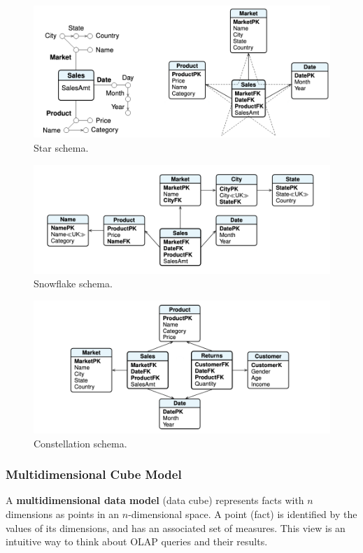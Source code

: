 \begin{figure}[ht]
    \centering
    \includegraphics[width=0.65\linewidth]{img/star_schema.png}
    \caption{Star schema.}
    \label{fig:star-schema}
\end{figure} 
\begin{figure}[ht]
    \centering
    \includegraphics[width=0.65\linewidth]{img/snowflake_schema.png}
    \caption{Snowflake schema.}
    \label{fig:snowflake-schema}
\end{figure}
\begin{figure}[H]
    \centering
    \includegraphics[width=0.65\linewidth]{img/constellation_schema.png}
    \caption{Constellation schema.}
    \label{fig:constellation-schema}
\end{figure}

\subsubsection{Multidimensional Cube Model}

A \textbf{multidimensional data model} (data cube) represents facts with $n$ dimensions as points in an $n$-dimensional space. A point (fact) is identified by the values of its dimensions, and has an associated set of measures. This view is an intuitive way to think about OLAP queries and their results.

